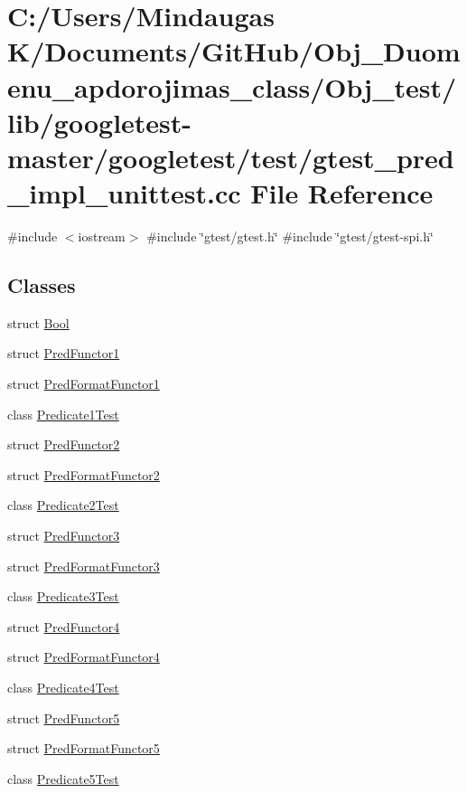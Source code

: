 \hypertarget{_obj__test_2lib_2googletest-master_2googletest_2test_2gtest__pred__impl__unittest_8cc}{}\section{C\+:/\+Users/\+Mindaugas K/\+Documents/\+Git\+Hub/\+Obj\+\_\+\+Duomenu\+\_\+apdorojimas\+\_\+class/\+Obj\+\_\+test/lib/googletest-\/master/googletest/test/gtest\+\_\+pred\+\_\+impl\+\_\+unittest.cc File Reference}
\label{_obj__test_2lib_2googletest-master_2googletest_2test_2gtest__pred__impl__unittest_8cc}
{\ttfamily \#include $<$iostream$>$}\newline
{\ttfamily \#include \char`\"{}gtest/gtest.\+h\char`\"{}}\newline
{\ttfamily \#include \char`\"{}gtest/gtest-\/spi.\+h\char`\"{}}\newline
\subsection*{Classes}
\begin{DoxyCompactItemize}
\item 
struct \mbox{\hyperlink{struct_bool}{Bool}}
\item 
struct \mbox{\hyperlink{struct_pred_functor1}{Pred\+Functor1}}
\item 
struct \mbox{\hyperlink{struct_pred_format_functor1}{Pred\+Format\+Functor1}}
\item 
class \mbox{\hyperlink{class_predicate1_test}{Predicate1\+Test}}
\item 
struct \mbox{\hyperlink{struct_pred_functor2}{Pred\+Functor2}}
\item 
struct \mbox{\hyperlink{struct_pred_format_functor2}{Pred\+Format\+Functor2}}
\item 
class \mbox{\hyperlink{class_predicate2_test}{Predicate2\+Test}}
\item 
struct \mbox{\hyperlink{struct_pred_functor3}{Pred\+Functor3}}
\item 
struct \mbox{\hyperlink{struct_pred_format_functor3}{Pred\+Format\+Functor3}}
\item 
class \mbox{\hyperlink{class_predicate3_test}{Predicate3\+Test}}
\item 
struct \mbox{\hyperlink{struct_pred_functor4}{Pred\+Functor4}}
\item 
struct \mbox{\hyperlink{struct_pred_format_functor4}{Pred\+Format\+Functor4}}
\item 
class \mbox{\hyperlink{class_predicate4_test}{Predicate4\+Test}}
\item 
struct \mbox{\hyperlink{struct_pred_functor5}{Pred\+Functor5}}
\item 
struct \mbox{\hyperlink{struct_pred_format_functor5}{Pred\+Format\+Functor5}}
\item 
class \mbox{\hyperlink{class_predicate5_test}{Predicate5\+Test}}
\end{DoxyCompactItemize}
